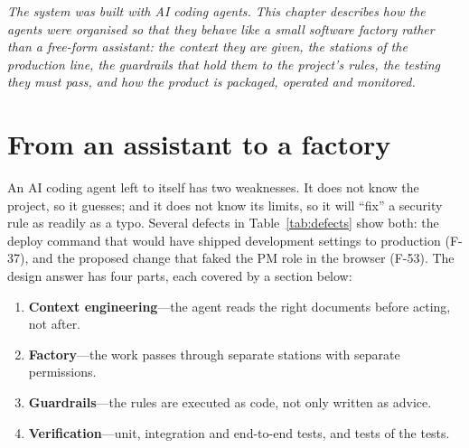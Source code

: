 \documentclass[../main.tex]{subfiles}
\begin{document}
\textit{The system was built with AI coding agents. This chapter describes how the agents were
organised so that they behave like a small software factory rather than a free-form assistant:
the context they are given, the stations of the production line, the guardrails that hold them to
the project's rules, the testing they must pass, and how the product is packaged, operated and
monitored.}

\section{From an assistant to a factory}
An AI coding agent left to itself has two weaknesses. It does not know the project, so it guesses;
and it does not know its limits, so it will ``fix'' a security rule as readily as a typo. Several
defects in Table~\ref{tab:defects} show both: the deploy command that would have shipped
development settings to production (F-37), and the proposed change that faked the PM role in the
browser (F-53). The design answer has four parts, each covered by a section below:
\begin{enumerate}
  \item \textbf{Context engineering}---the agent reads the right documents before acting, not after.
  \item \textbf{Factory}---the work passes through separate stations with separate permissions.
  \item \textbf{Guardrails}---the rules are executed as code, not only written as advice.
  \item \textbf{Verification}---unit, integration and end-to-end tests, and tests of the tests.
\end{enumerate}
\end{document}
